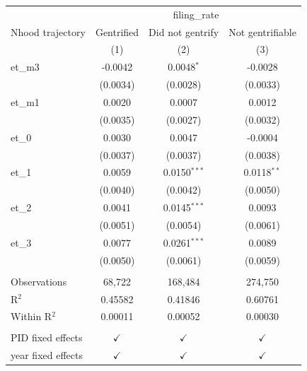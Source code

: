 
\begingroup
\centering
\begin{tabular}{lccc}
   \toprule
    & \multicolumn{3}{c}{filing\_rate}\\
   Nhood trajectory   & Gentrified    & Did not gentrify & Not gentrifiable \\   
                      & (1)           & (2)              & (3)\\  
   \midrule 
   et\_m3             & -0.0042       & 0.0048$^{*}$     & -0.0028\\   
                      & (0.0034)      & (0.0028)         & (0.0033)\\   
   et\_m1             & 0.0020        & 0.0007           & 0.0012\\   
                      & (0.0035)      & (0.0027)         & (0.0032)\\   
   et\_0              & 0.0030        & 0.0047           & -0.0004\\   
                      & (0.0037)      & (0.0037)         & (0.0038)\\   
   et\_1              & 0.0059        & 0.0150$^{***}$   & 0.0118$^{**}$\\   
                      & (0.0040)      & (0.0042)         & (0.0050)\\   
   et\_2              & 0.0041        & 0.0145$^{***}$   & 0.0093\\   
                      & (0.0051)      & (0.0054)         & (0.0061)\\   
   et\_3              & 0.0077        & 0.0261$^{***}$   & 0.0089\\   
                      & (0.0050)      & (0.0061)         & (0.0059)\\   
    \\
   Observations       & 68,722        & 168,484          & 274,750\\  
   R$^2$              & 0.45582       & 0.41846          & 0.60761\\  
   Within R$^2$       & 0.00011       & 0.00052          & 0.00030\\  
    \\
   PID fixed effects  & $\checkmark$  & $\checkmark$     & $\checkmark$\\   
   year fixed effects & $\checkmark$  & $\checkmark$     & $\checkmark$\\   
   \bottomrule
\end{tabular}
\par\endgroup


